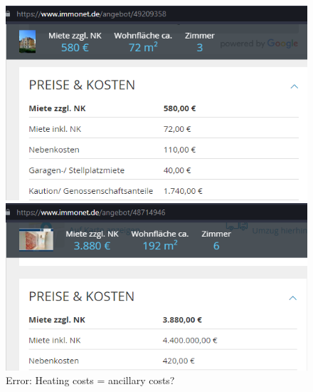 \begin{figure}[H]
	\begin{center}
		\begin{minipage}{0.4\textwidth}
			\includegraphics[width=0.7\linewidth]{img/49209358}
		\end{minipage}
		\begin{minipage}{0.4\textwidth}
			\includegraphics[width=0.7\linewidth]{img/48714946  }
		\end{minipage}
	\end{center}
	\caption{Error: Heating costs = ancillary costs? }
	\label{Error: allgemeine Fehler}
\end{figure}